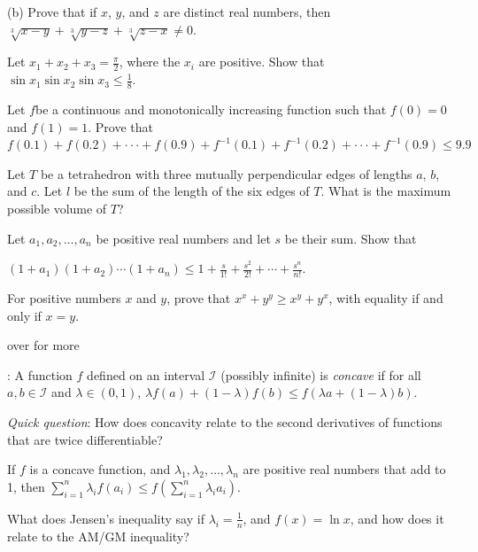 \documentclass{article}
\begin{document}
(b) { }Prove that if \(x\), \(y\), and \(z\) are distinct real numbers, then \(\sqrt[3]{x-y}+ \sqrt[3]{y-z}+\sqrt[3]{z-x}\neq 0\).

Let \(x_1+x_2+x_3=\frac{\pi }{2}\), where the \(x_i\) are positive. { } Show that { }\(\sin  x_1\sin  x_2 \sin  x_3\leq \frac{1}{8}\).

Let \(f\)be a continuous and monotonically increasing function such that \(f(0) = 0\) and \(f(1) = 1\). Prove that { } \\
 { } { } { } { }\(f(0.1)+f(0.2)+\cdot  \cdot  \cdot +f(0.9)+f^{-1}(0.1)+f^{-1}(0.2)+\cdot  \cdot  \cdot +f^{-1}(0.9) \leq  9.9\)

Let \(T\) be a tetrahedron with three mutually perpendicular edges of lengths \(a\), \(b\), and \(c\). { }Let \(l\) be the sum of the length of the
six edges of \(T\). { }What is the maximum possible volume of \(T\)?

Let \(a_1, a_2, \ldots  , a_n\) be positive real numbers and let \(s\) be their sum. { }Show that 



\(\left(1+a_1\right)\left(1+a_2\right)\cdots \left(1+a_n\right) \leq  1 + \frac{s}{1!}+ \frac{s^2}{2!}+ \cdots +\frac{s^n}{n!}\).$\quad $

For positive numbers \(x\) and \(y\), prove that \(x^x+y^y\geq x^y+ y^x\), with equality if and only if \(x=y\).



over for more



: A function \(f\) defined on an interval $\mathcal{I}$ (possibly infinite) is \textit{ concave} if for all \(a, b\in \mathcal{I}\)
and \(\lambda \in (0,1)\), \(\lambda  f(a) + (1-\lambda )f(b)\leq f(\lambda  a+(1-\lambda )b)\).



\textit{ Quick question}: { } How does concavity relate to the second derivatives of functions that are twice differentiable?



 { }If \(f\) is a concave function, and \(\lambda _1, \lambda _2, \ldots , \lambda _n\) are positive real numbers that
add to 1, { }then \(\sum _{i=1}^n \lambda _if\left(a_i\right)\leq f\left(\sum _{i=1}^n \lambda _ia_i\right)\).

What does Jensen's inequality say if \(\lambda _i= \frac{1}{n}\), and { }\(f(x) = \ln  x\), and how does it relate to the AM/GM inequality?
\end{document}

